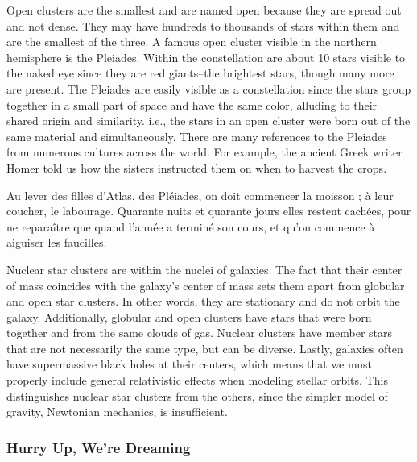 Open clusters are the smallest and are named open because they are spread out and not dense. They may have hundreds to thousands of stars within them and are the smallest of the three. A famous open cluster visible in the northern hemisphere is the Pleiades. Within the constellation are about 10 stars visible to the naked eye since they are red giants–the brightest stars, though many more are present. The Pleiades are easily visible as a constellation since the stars group together in a small part of space and have the same color, alluding to their shared origin and similarity. i.e., the stars in an open cluster were born out of the same material and simultaneously. There are many references to the Pleiades from numerous cultures across the world. For example, the ancient Greek writer Homer told us how the sisters instructed them on when to harvest the crops. 

Au lever des filles d'Atlas, des Pléiades, on doit commencer la moisson ; à leur coucher, le labourage. Quarante nuits et quarante jours elles restent cachées, pour ne reparaître que quand l'année a terminé son cours, et qu'on commence à aiguiser les faucilles.

Nuclear star clusters are within the nuclei of galaxies. The fact that their center of mass coincides with the galaxy's center of mass sets them apart from globular and open star clusters. In other words, they are stationary and do not orbit the galaxy. Additionally, globular and open clusters have stars that were born together and from the same clouds of gas. Nuclear clusters have member stars that are not necessarily the same type, but can be diverse. Lastly, galaxies often have supermassive black holes at their centers, which means that we must properly include general relativistic effects when modeling stellar orbits. This distinguishes nuclear star clusters from the others, since the simpler model of gravity, Newtonian mechanics, is insufficient.

\subsubsection*{Hurry Up, We're Dreaming}


